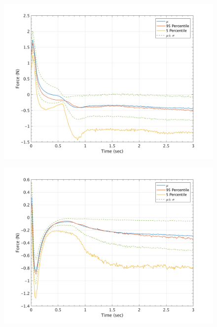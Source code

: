 \documentclass{article}
\begin{document}
\begin{figure}[H]
        \begin{minipage}[b]{0.5\linewidth}
                \centering
                \includegraphics[width=1\textwidth]{InclinedPlane/GlobalRecords/P_Global_Fx.png}
                \label{fig:Ramp-SP-Fx-P}
        \end{minipage}
        \begin{minipage}[b]{0.5\linewidth}
                \centering
                \includegraphics[width=1\textwidth]{InclinedPlane/GlobalRecords/P_Global_Fy.png}
                \label{fig:Ramp-SP-Fy-P}
        \end{minipage}


\end{figure}
\end{document}
